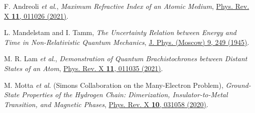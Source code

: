\documentclass[a4paper, 14pt]{extarticle}
\begin{document}
\clearpage
{}
{}
\begin{thebibliography}{9}
	 F. Andreoli \textit{et al}., \textit{Maximum Refractive Index of an Atomic Medium}, \href{http://dx.doi.org/10.1103/PhysRevX.11.011026}{Phys. Rev. X \textbf{11}, 011026 (2021)}.

	 L. Mandelstam and I. Tamm, \textit{The Uncertainty Relation between Energy and Time in Non-Relativistic Quantum Mechanics}, \href{https://doi.org/10.1007/978-3-642-74626-0_8}{J. Phys. (Moscow) 9, 249 (1945)}.

	 M. R. Lam \textit{et al}., \textit{Demonstration of Quantum Brachistochrones between Distant States of an Atom}, \href{http://dx.doi.org/10.1103/PhysRevX.11.011035}{Phys. Rev. X \textbf{11}, 011035 (2021)}.

	 M. Motta \textit{et al}. (Simons Collaboration on the Many-Electron Problem), \textit{Ground-State Properties of the Hydrogen Chain: Dimerization, Insulator-to-Metal Transition, and Magnetic Phases}, \href{http://dx.doi.org/10.1103/PhysRevX.10.031058}{Phys. Rev. X \textbf{10}, 031058 (2020)}.
\end{thebibliography}
\end{document}
